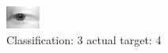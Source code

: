 \begin{figure}[h!]
\begin{center}
\includegraphics[width=0.60\columnwidth]{figures/ID2679_class_3_target_4.png}
\end{center}
\caption{ Classification: 3 actual target: 4}
\label{fig:ID2679_class_3_target_4}
\end{figure}
